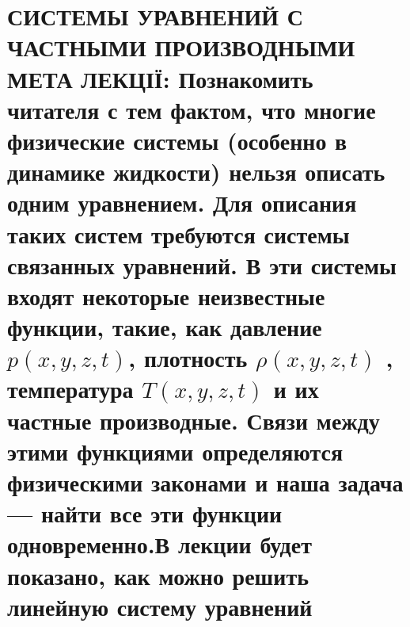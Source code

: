 \documentclass[
  ukrainian,
]{article}
\begin{document}
\section{\texorpdfstring{СИСТЕМЫ УРАВНЕНИЙ С ЧАСТНЫМИ ПРОИЗВОДНЫМИ МЕТА
ЛЕКЦІЇ: Познакомить читателя с тем фактом, что многие физические системы
(особенно в динамике жидкости) нельзя описать одним уравнением. Для
описания таких систем требуются системы связанных уравнений. В эти
системы входят некоторые неизвестные функции, такие, как давление
\(p(x, y, z, t)\), плотность \(\rho(x, y, z, t)\) , температура
\(T(x, y, z, t)\) и их частные производные. Связи между этими функциями
определяются физическими законами и наша задача --- найти все эти
функции одновременно.В лекции будет показано, как можно решить линейную
систему
уравнений}{СИСТЕМЫ УРАВНЕНИЙ С ЧАСТНЫМИ ПРОИЗВОДНЫМИ МЕТА ЛЕКЦІЇ: Познакомить читателя с тем фактом, что многие физические системы (особенно в динамике жидкости) нельзя описать одним уравнением. Для описания таких систем требуются системы связанных уравнений. В эти системы входят некоторые неизвестные функции, такие, как давление p(x, y, z, t), плотность \textbackslash rho(x, y, z, t) , температура T(x, y, z, t) и их частные производные. Связи между этими функциями определяются физическими законами и наша задача --- найти все эти функции одновременно.В лекции будет показано, как можно решить линейную систему }}
\end{document}
